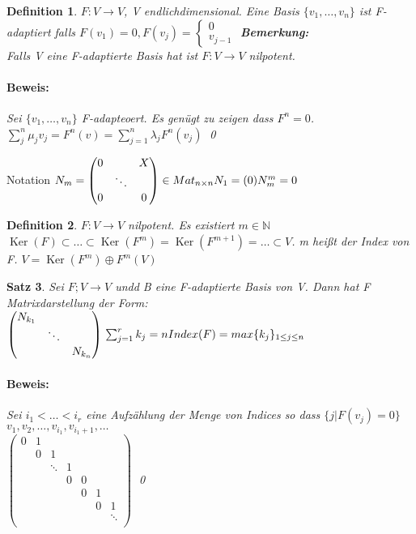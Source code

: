 \documentclass{report}
\newcommand{\lb}{\lambda}
\newcommand{\N}{\mathbb{N}}
\DeclareMathOperator{\Ker}{Ker}
\theoremstyle{customrem}
\theoremstyle{customdef}
\newtheorem{definition}{Definition}[chapter]
\newtheorem{satz}[definition]{Satz}
\renewenvironment{proof}{\paragraph{Beweis: }}{\qed}
\theoremstyle{customenv}
\begin{document}

\begin{definition}
  \(F : V \to V\), V endlichdimensional. Eine Basis \(\{v_1, \dots, v_n\}\) ist 
  F-adaptiert falls \(F(v_1) = 0, F(v_j) = \begin{cases}
  0\\
  v_{j-1}
  \end{cases}\)
  \textbf{Bemerkung:}\\
  Falls V eine F-adaptierte Basis hat ist \(F : V \to V\) nilpotent.
  \begin{proof}
    Sei \(\{v_1, \dots, v_n\}\) F-adapteoert. Es gen\"ugt zu zeigen dass
    \(F^n = 0\).\\
    \(\sum_j^n \mu_jv_j = F^n(v) = \sum_{j=1}^n \lb_j F^n(v_j)\)
  \end{proof}
\end{definition}

Notation \(N_m = \begin{pmatrix}
0&&X\\
&\ddots\\
0&&0\\
\end{pmatrix}
\in Mat_{n \times n}\\
N_1 = (0)\\
N_m^m = 0
\)

\begin{definition}
  \(F : V \to V\) nilpotent. Es existiert \(m \in \N\)
  \(\Ker(F) \subset \dots \subset \Ker(F^m) = \Ker(F^{m+1}) = \dots \subset V\).
  m hei\ss{}t der Index von F. \(V = \Ker(F^m) \oplus F^m(V)\)
\end{definition}

\begin{satz}
  Sei \(F ; V \to V\) undd B eine F-adaptierte Basis von V. Dann hat F
  Matrixdarstellung der Form:\\
  \(
  \begin{pmatrix}
    N_{k_1}\\
    &\ddots\\
    &&N_{k_n}\\
  \end{pmatrix}\\
  \sum_{j=1}^r k_j = n\\
  Index(F) = max\{k_j\}_{1 \le j \le n}
  \)
  \begin{proof}
    Sei \(i_1 < \dots < i_r\) eine Aufz\"ahlung der Menge von Indices so dass 
    \(\{j | F(v_j) = 0\}\)\\
    \(v_1, v_2, \dots, v_{i_1}, v_{i_1 + 1}, \dots\)\\
    \(
    \begin{pmatrix}
    0&1\\
     &0&1\\
     & &\ddots&1\\
     &&&0&0\\
     &&&&0&1\\
     &&&&&0 & 1\\
     &&&&&&\ddots\\
    \end{pmatrix}
    \)
  \end{proof}
\end{satz}
\end{document}
